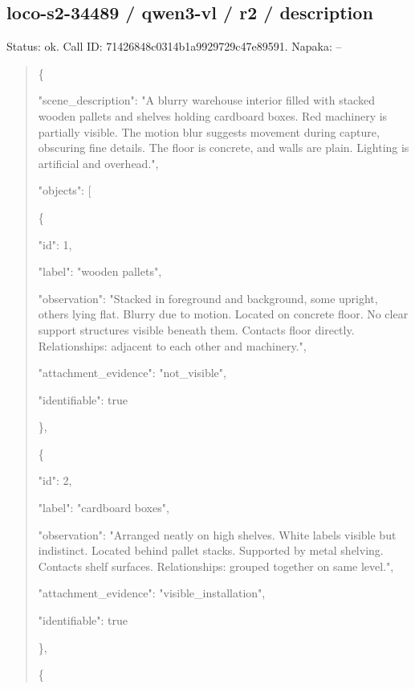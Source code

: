 \documentclass[10pt,a4paper]{article}
\begin{document}
\subsection*{loco-s2-34489 / qwen3-vl / r2 / description}
Status: ok. Call ID: 71426848c0314b1a9929729c47e89591. Napaka: --
\begin{quote}\footnotesize
\{\par
  "scene\_description":\allowbreak{} "A blurry warehouse interior filled with stacked wooden pallets and shelves holding cardboard boxes. Red machinery is partially visible. The motion blur suggests movement during capture,\allowbreak{} obscuring fine details. The floor is concrete,\allowbreak{} and walls are plain. Lighting is artificial and overhead.",\allowbreak{}\par
  "objects":\allowbreak{} [\par
    \{\par
      "id":\allowbreak{} 1,\allowbreak{}\par
      "label":\allowbreak{} "wooden pallets",\allowbreak{}\par
      "observation":\allowbreak{} "Stacked in foreground and background,\allowbreak{} some upright,\allowbreak{} others lying flat. Blurry due to motion. Located on concrete floor. No clear support structures visible beneath them. Contacts floor directly. Relationships:\allowbreak{} adjacent to each other and machinery.",\allowbreak{}\par
      "attachment\_evidence":\allowbreak{} "not\_visible",\allowbreak{}\par
      "identifiable":\allowbreak{} true\par
    \},\allowbreak{}\par
    \{\par
      "id":\allowbreak{} 2,\allowbreak{}\par
      "label":\allowbreak{} "cardboard boxes",\allowbreak{}\par
      "observation":\allowbreak{} "Arranged neatly on high shelves. White labels visible but indistinct. Located behind pallet stacks. Supported by metal shelving. Contacts shelf surfaces. Relationships:\allowbreak{} grouped together on same level.",\allowbreak{}\par
      "attachment\_evidence":\allowbreak{} "visible\_installation",\allowbreak{}\par
      "identifiable":\allowbreak{} true\par
    \},\allowbreak{}\par
    \{\par

\end{quote}
\end{document}
